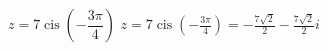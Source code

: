 { $z = 7\operatorname{cis}\left(-\dfrac{3\pi}{4}\right)$ }
{ $z = 7\operatorname{cis}\left(-\frac{3\pi}{4}\right) = -\frac{7\sqrt{2}}{2} - \frac{7\sqrt{2}}{2}i$ }
